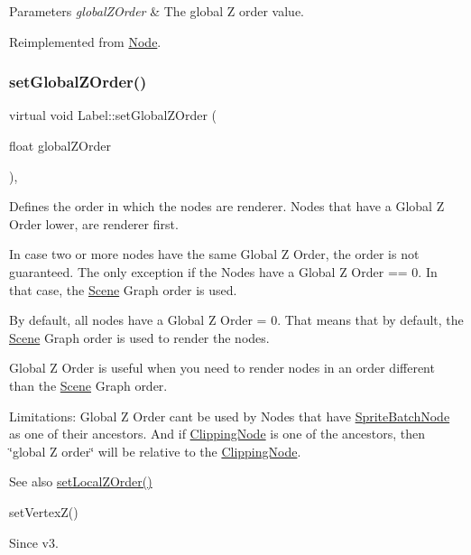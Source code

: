 \begin{DoxyParams}{Parameters}
{\em global\+Z\+Order} & The global Z order value. \\
\hline
\end{DoxyParams}


Reimplemented from \hyperlink{classNode_a32a5b9cb9a408d04008c4935a4776566}{Node}.

\mbox{\label{classLabel_a8a3965a4546b01df9e3f1302c6ce62dc}} 
\subsubsection{\texorpdfstring{set\+Global\+Z\+Order()}{setGlobalZOrder()}\hspace{0.1cm}{\footnotesize\ttfamily [2/2]}}
{\footnotesize\ttfamily virtual void Label\+::set\+Global\+Z\+Order (\begin{DoxyParamCaption}\item[{float}]{global\+Z\+Order }\end{DoxyParamCaption})\hspace{0.3cm}{\ttfamily [override]}, {\ttfamily [virtual]}}

Defines the order in which the nodes are renderer. Nodes that have a Global Z Order lower, are renderer first.

In case two or more nodes have the same Global Z Order, the order is not guaranteed. The only exception if the Nodes have a Global Z Order == 0. In that case, the \hyperlink{classScene}{Scene} Graph order is used.

By default, all nodes have a Global Z Order = 0. That means that by default, the \hyperlink{classScene}{Scene} Graph order is used to render the nodes.

Global Z Order is useful when you need to render nodes in an order different than the \hyperlink{classScene}{Scene} Graph order.

Limitations\+: Global Z Order can\textquotesingle{}t be used by Nodes that have \hyperlink{classSpriteBatchNode}{Sprite\+Batch\+Node} as one of their ancestors. And if \hyperlink{classClippingNode}{Clipping\+Node} is one of the ancestors, then \char`\"{}global Z order\char`\"{} will be relative to the \hyperlink{classClippingNode}{Clipping\+Node}.

\begin{DoxySeeAlso}{See also}
{\ttfamily \hyperlink{classNode_aee4e616c2d55b722226aae1e68b4946f}{set\+Local\+Z\+Order()}} 

{\ttfamily set\+Vertex\+Z()}
\end{DoxySeeAlso}
\begin{DoxySince}{Since}
v3.
\end{DoxySince}

